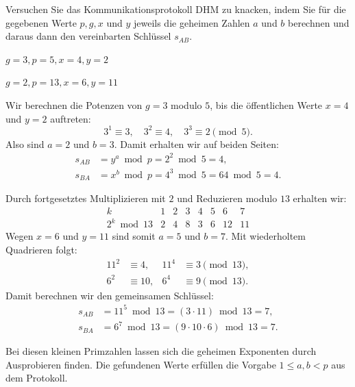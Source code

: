 \begin{myexercise}
	Versuchen Sie das Kommunikationsprotokoll \gls{DHM} zu knacken, indem Sie
	für die gegebenen Werte $p, g, x$ und $y$ jeweils die geheimen Zahlen $a$ und $b$ berechnen und daraus
	dann den vereinbarten Schlüssel $s_{AB}$.
	\begin{aenum}
		\item $g = 3, p = 5, x = 4, y = 2$
		\item $g = 2, p = 13, x = 6, y = 11$
	\end{aenum}
	\begin{myanswer}
		\begin{aenum}
			\item Wir berechnen die Potenzen von $g=3$ modulo $5$, bis die öffentlichen Werte $x=4$ und $y=2$ auftreten:
			      \[
				      3^1 \equiv 3,\quad 3^2 \equiv 4,\quad 3^3 \equiv 2 \pmod 5.
			      \]
			      Also sind $a=2$ und $b=3$. Damit erhalten wir auf beiden Seiten:
			      \begin{align*}
				      s_{AB} &= y^a \bmod p = 2^2 \bmod 5 = 4, \\
				      s_{BA} &= x^b \bmod p = 4^3 \bmod 5 = 64 \bmod 5 = 4.
			      \end{align*}
			\item Durch fortgesetztes Multiplizieren mit $2$ und Reduzieren modulo $13$ erhalten wir:
			      \[
				      \begin{array}{c|rrrrrrr}
					      k & 1 & 2 & 3 & 4 & 5 & 6 & 7 \\
					      \hline
					      2^k \bmod 13 & 2 & 4 & 8 & 3 & 6 & 12 & 11
				      \end{array}
			      \]
			      Wegen $x=6$ und $y=11$ sind somit $a=5$ und $b=7$. Mit wiederholtem Quadrieren folgt:
			      \begin{align*}
				      11^2 &\equiv 4, & 11^4 &\equiv 3 \pmod{13}, \\
				      6^2 &\equiv 10, & 6^4 &\equiv 9 \pmod{13}.
			      \end{align*}
			      Damit berechnen wir den gemeinsamen Schlüssel:
			      \begin{align*}
				      s_{AB} &= 11^5 \bmod 13 = (3\cdot 11) \bmod 13 = 7, \\
				      s_{BA} &= 6^7 \bmod 13 = (9\cdot 10\cdot 6) \bmod 13 = 7.
			      \end{align*}
		\end{aenum}
		Bei diesen kleinen Primzahlen lassen sich die geheimen Exponenten durch Ausprobieren finden. Die gefundenen Werte erfüllen die Vorgabe $1\leq a,b<p$ aus dem Protokoll.
	\end{myanswer}
\end{myexercise}

